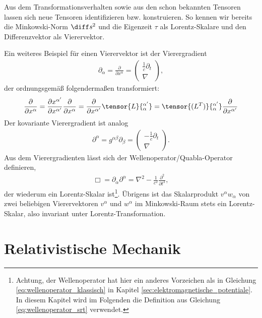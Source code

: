 Aus dem Transformationsverhalten sowie aus den schon bekannten Tensoren lassen sich neue Tensoren identifizieren bzw. konstruieren.
So kennen wir bereits die Minkowski-Norm $\diff s^2$ und die Eigenzeit $\tau$ als Lorentz-Skalare und den Differenzvektor als Vierervektor.

Ein weiteres Beispiel für einen Vierervektor ist der Vierergradient
\begin{align*}
    \partial_\alpha=\frac{\partial}{\partial x^\alpha}=\begin{pmatrix}\frac{1}{c}\partial_t\\ \nabla \end{pmatrix},
\end{align*}
der ordnungsgemäß folgendermaßen transformiert:
\begin{align*}
    \frac{\partial}{\partial x^\alpha}=\frac{\partial x^{\alpha'}}{\partial x^{\alpha'}}\frac{\partial}{\partial x^\alpha}=\frac{\partial}{\partial x^{\alpha'}} \tensor{L}{^{\alpha'}_\alpha}=\tensor{(L^T)}{_\alpha^{\alpha'}}\frac{\partial}{\partial x^{\alpha'}}
\end{align*}
Der kovariante Vierergradient ist analog
\begin{align*}
    \partial^\alpha=g^{\alpha\beta}\partial_\beta=\begin{pmatrix}-\frac{1}{c}\partial_t\\ \nabla \end{pmatrix}.
\end{align*}
Aus dem Vierergradienten lässt sich der Wellenoperator/Quabla-Operator definieren,
\begin{align}
    \label{eq:wellenoperator_srt}
    \Box =\partial_\alpha\partial^\alpha =\nabla^2-\frac{1}{c^2} \frac{\partial^2}{\partial t^2},
\end{align}
der wiederum ein Lorentz-Skalar ist\footnote{Achtung, der Wellenoperator hat hier ein anderes Vorzeichen als in Gleichung
    \eqref{eq:wellenoperator_klassisch} in Kapitel \ref{sec:elektromagnetische_potentiale}. In diesem Kapitel wird im Folgenden die Definition aus Gleichung \eqref{eq:wellenoperator_srt} verwendet. }.
Übrigens ist das Skalarprodukt $v^\alpha w_\alpha$ von zwei beliebigen Vierervektoren $v^\alpha$ und $w^\alpha$ im Minkowski-Raum stets ein Lorentz-Skalar, also invariant unter Lorentz-Transformation.



\section{Relativistische Mechanik}

